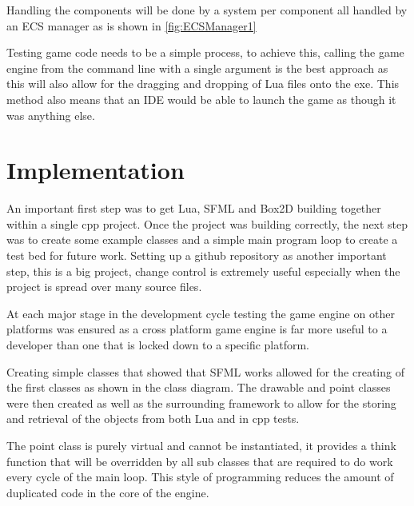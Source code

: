 \documentclass[11pt,a4paper,titlepage]{report}
\begin{document}
	Handling the components will be done by a system per component all handled by an ECS manager as is shown in \ref{fig:ECSManager1}


	Testing game code needs to be a simple process, to achieve this, calling the game engine from the command line with a single argument is the best approach as this will also allow for the dragging and dropping of Lua files onto the exe. This method also means that an IDE would be able to launch the game as though it was anything else.








\chapter{Implementation}


    
    An important first step was to get Lua, SFML and Box2D building together within a single cpp project. Once the project was building correctly, the next step was to create some example classes and a simple main program loop to create a test bed for future work. Setting up a github repository as another important step, this is a big project, change control is extremely useful especially when the project is spread over many source files.

    At each major stage in the development cycle testing the game engine on other platforms was ensured as a cross platform game engine is far more useful to a developer than one that is locked down to a specific platform.

    
    Creating simple classes that showed that SFML works allowed for the creating of the first classes as shown in the class diagram. The drawable and point classes were then created as well as the surrounding framework to allow for the storing and retrieval of the objects from both Lua and in cpp tests.

    The point class is purely virtual and cannot be instantiated, it provides a think function that will be overridden by all sub classes that are required to do work every cycle of the main loop. This style of programming reduces the amount of duplicated code in the core of the engine.
\end{document}
